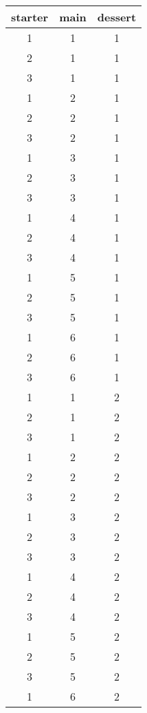 \documentclass[article, crop=false]{standalone}
\begin{document}





\begin{table}[!hb]
\centering
\begin{tabular}{ccc}
\toprule
starter & main & dessert\\
\midrule
1 & 1 & 1\\
2 & 1 & 1\\
3 & 1 & 1\\
1 & 2 & 1\\
2 & 2 & 1\\
3 & 2 & 1\\
1 & 3 & 1\\
2 & 3 & 1\\
3 & 3 & 1\\
1 & 4 & 1\\
2 & 4 & 1\\
3 & 4 & 1\\
1 & 5 & 1\\
2 & 5 & 1\\
3 & 5 & 1\\
1 & 6 & 1\\
2 & 6 & 1\\
3 & 6 & 1\\
1 & 1 & 2\\
2 & 1 & 2\\
3 & 1 & 2\\
1 & 2 & 2\\
2 & 2 & 2\\
3 & 2 & 2\\
1 & 3 & 2\\
2 & 3 & 2\\
3 & 3 & 2\\
1 & 4 & 2\\
2 & 4 & 2\\
3 & 4 & 2\\
1 & 5 & 2\\
2 & 5 & 2\\
3 & 5 & 2\\
1 & 6 & 2\\

\end{tabular}
\end{table}
\end{document}
